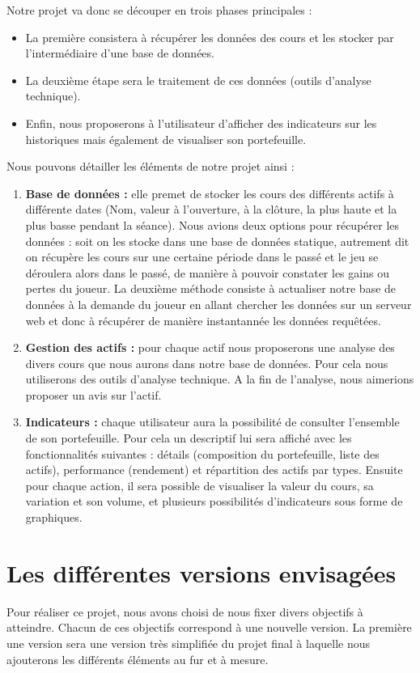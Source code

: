 Notre projet va donc se découper en trois phases principales : 
\begin{itemize}
\item La première consistera à récupérer les données des cours et les stocker par l’intermédiaire d’une base de données.
\item La deuxième étape sera le traitement de ces données (outils d’analyse technique).
\item Enfin, nous proposerons à l’utilisateur d'afficher des indicateurs sur les historiques mais également de visualiser son portefeuille. 
\end{itemize}

Nous pouvons détailler les éléments de notre projet ainsi :
\begin{enumerate}
  \item \textbf{Base de données :}
    elle premet de stocker les cours des différents actifs à différente dates (Nom, valeur à l’ouverture, à la clôture, la plus haute et la plus basse pendant la séance). Nous avions deux options pour récupérer les données : soit on les stocke dans une base de données statique, autrement dit on récupère les cours sur une certaine période dans le passé et le jeu se déroulera alors dans le passé, de manière à pouvoir constater les gains ou pertes du joueur. La deuxième méthode consiste à actualiser notre base de données à la demande du joueur en allant chercher les données sur un serveur web et donc à récupérer de manière instantannée les données requêtées. 
  \item \textbf{Gestion des actifs :}
    pour chaque actif nous proposerons une analyse des divers cours que nous aurons dans notre base de données. Pour cela nous utiliserons des outils d’analyse technique. A la fin de l’analyse, nous aimerions proposer un avis sur l’actif. 
  \item \textbf{Indicateurs :}
    chaque utilisateur aura la possibilité de consulter l’ensemble de son portefeuille. Pour cela un descriptif lui sera affiché avec les fonctionnalités suivantes : détails (composition du portefeuille, liste des actifs), performance (rendement) et répartition des actifs par types. Ensuite pour chaque action, il sera possible de visualiser la valeur du cours, sa variation et son volume, et plusieurs possibilités d’indicateurs sous forme de graphiques. 
\end{enumerate}

\section{Les différentes versions envisagées}
Pour réaliser ce projet, nous avons choisi de nous fixer divers objectifs à atteindre. Chacun de ces objectifs correspond à une nouvelle version. La première une version sera une version très simplifiée du projet final à laquelle nous ajouterons les différents éléments au fur et à mesure.\\

